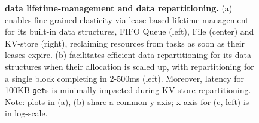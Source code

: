 \begin{figure}[t]
  \centering
  \vspace{-1.25em}
  \caption{\textbf{\jiffy data lifetime-management and data repartitioning.} (a) \jiffy enables fine-grained elasticity via lease-based lifetime management for its built-in data structures, FIFO Queue (left), File (center) and KV-store (right), reclaiming resources from tasks as soon as their leases expire. (b) \jiffy facilitates efficient data repartitioning for its data structures when their allocation is scaled up, with repartitioning for a single block completing in $2$-$500$ms (left). Moreover, \jiffy latency for 100KB \texttt{get}s is minimally impacted during KV-store repartitioning. Note: plots in (a), (b) share a common y-axis; x-axis for (c, left) is in log-scale.}\vspace{-1em}
\end{figure}



